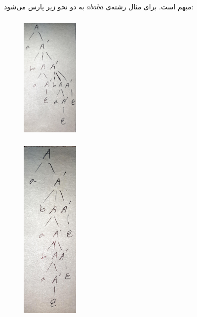 \documentclass{article}
\begin{document}
\subsection{}
مبهم است. برای مثال رشته‌ی $a b a b a$ به دو نحو زیر پارس می‌شود:
\subsubsection{}
\begin{figure}[H]
    \centering
    \includegraphics[width=0.25\textwidth]{figures/c3.jpg}
    \caption
	{}
    \label{fig:fig1}
\end{figure}
\subsubsection{}
\begin{figure}[H]
    \centering
    \includegraphics[width=0.25\textwidth]{figures/c4.jpg}
    \caption
	{}
    \label{fig:fig1}
\end{figure}
\end{document}

